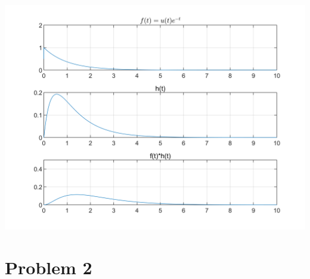 \documentclass[UTF8,a4paper]{article}
\begin{document}
\includegraphics[scale=1]{1-2卷积.png}
\section{Problem 2}
\end{document}
